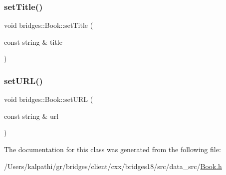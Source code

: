 \mbox{\label{classbridges_1_1_book_a68e4e04db8915b6baff809c46e6d1df9}} 
\subsubsection{\texorpdfstring{set\+Title()}{setTitle()}}
{\footnotesize\ttfamily void bridges\+::\+Book\+::set\+Title (\begin{DoxyParamCaption}\item[{const string \&}]{title }\end{DoxyParamCaption})\hspace{0.3cm}{\ttfamily [inline]}}

\mbox{\label{classbridges_1_1_book_a48d590f296837b8eb9ac10451c83d23b}} 
\subsubsection{\texorpdfstring{set\+U\+R\+L()}{setURL()}}
{\footnotesize\ttfamily void bridges\+::\+Book\+::set\+U\+RL (\begin{DoxyParamCaption}\item[{const string \&}]{url }\end{DoxyParamCaption})\hspace{0.3cm}{\ttfamily [inline]}}



The documentation for this class was generated from the following file\+:\begin{DoxyCompactItemize}
\item 
/\+Users/kalpathi/gr/bridges/client/cxx/bridges18/src/data\+\_\+src/\mbox{\hyperlink{_book_8h}{Book.\+h}}\end{DoxyCompactItemize}
